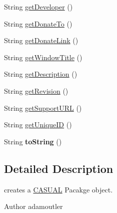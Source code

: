 \begin{DoxyCompactItemize}
\item 
String \hyperlink{class_c_a_s_u_a_l_1_1network_1_1_c_a_s_u_a_l_dev_integration_1_1_c_a_s_u_a_l_package_a317dd682706fbca3a6b824b1bdd95bf6}{get\-Developer} ()
\item 
String \hyperlink{class_c_a_s_u_a_l_1_1network_1_1_c_a_s_u_a_l_dev_integration_1_1_c_a_s_u_a_l_package_ae6cf4fa3dda95a960ae2c1ec624aced2}{get\-Donate\-To} ()
\item 
String \hyperlink{class_c_a_s_u_a_l_1_1network_1_1_c_a_s_u_a_l_dev_integration_1_1_c_a_s_u_a_l_package_a2d74db1d0bf85366731bc69f308f0b77}{get\-Donate\-Link} ()
\item 
String \hyperlink{class_c_a_s_u_a_l_1_1network_1_1_c_a_s_u_a_l_dev_integration_1_1_c_a_s_u_a_l_package_af0fd0d4013146a6c6cd10f99dd0958fc}{get\-Window\-Title} ()
\item 
String \hyperlink{class_c_a_s_u_a_l_1_1network_1_1_c_a_s_u_a_l_dev_integration_1_1_c_a_s_u_a_l_package_a7eb3b7a0a55e7319db1e78523e5a8b50}{get\-Description} ()
\item 
String \hyperlink{class_c_a_s_u_a_l_1_1network_1_1_c_a_s_u_a_l_dev_integration_1_1_c_a_s_u_a_l_package_a37b832d5421267d1a25f4c37dcfde3fd}{get\-Revision} ()
\item 
String \hyperlink{class_c_a_s_u_a_l_1_1network_1_1_c_a_s_u_a_l_dev_integration_1_1_c_a_s_u_a_l_package_aeb11b8addeb2395452d8a4ce4c552657}{get\-Support\-U\-R\-L} ()
\item 
String \hyperlink{class_c_a_s_u_a_l_1_1network_1_1_c_a_s_u_a_l_dev_integration_1_1_c_a_s_u_a_l_package_ac7e0ef051078ef27630d5bb58dd402ee}{get\-Unique\-I\-D} ()
\item 
\hypertarget{class_c_a_s_u_a_l_1_1network_1_1_c_a_s_u_a_l_dev_integration_1_1_c_a_s_u_a_l_package_a71075408f2030397ce8bfb94b22be062}{String {\bfseries to\-String} ()}\label{class_c_a_s_u_a_l_1_1network_1_1_c_a_s_u_a_l_dev_integration_1_1_c_a_s_u_a_l_package_a71075408f2030397ce8bfb94b22be062}

\end{DoxyCompactItemize}


\subsection{Detailed Description}
creates a \hyperlink{namespace_c_a_s_u_a_l}{C\-A\-S\-U\-A\-L} Pacakge object.

\begin{DoxyAuthor}{Author}
adamoutler 
\end{DoxyAuthor}


